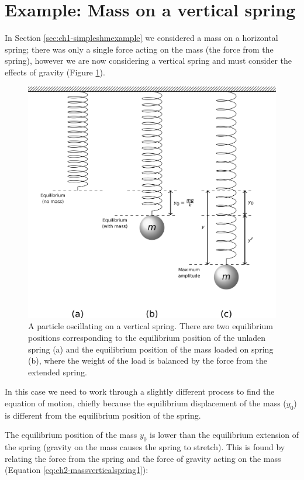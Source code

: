 \documentclass[
]{book}
\begin{document}
\hypertarget{sec:ch2-massverticalspring}{%
\section{Example: Mass on a vertical spring}\label{sec:ch2-massverticalspring}}

In Section \ref{sec:ch1-simpleshmexample} we considered a mass on a horizontal spring; there was only a single force acting on the mass (the force from the spring), however we are now considering a vertical spring and must consider the effects of gravity (Figure \ref{fig:ch2-massverticalspring1}).

\begin{figure}

{\centering \includegraphics[width=0.7\linewidth]{visualisations/LaTeX/ch2-blocksonvertspring1} 

}

\caption{A particle oscillating on a vertical spring.  There are two equilibrium positions corresponding to the equilibrium position of the unladen spring (a) and the equilibrium position of the mass loaded on spring (b), where the weight of the load is balanced by the force from the extended spring.}\label{fig:ch2-massverticalspring1}
\end{figure}

In this case we need to work through a slightly different process to find the equation of motion, chiefly because the equilibrium displacement of the mass (\(y_0\)) is different from the equilibrium position of the spring.

The equilibrium position of the mass \(y_0\) is lower than the equilibrium extension of the spring (gravity on the mass causes the spring to stretch). This is found by relating the force from the spring and the force of gravity acting on the mass (Equation \eqref{eq:ch2-massverticalspring1}):
\end{document}
